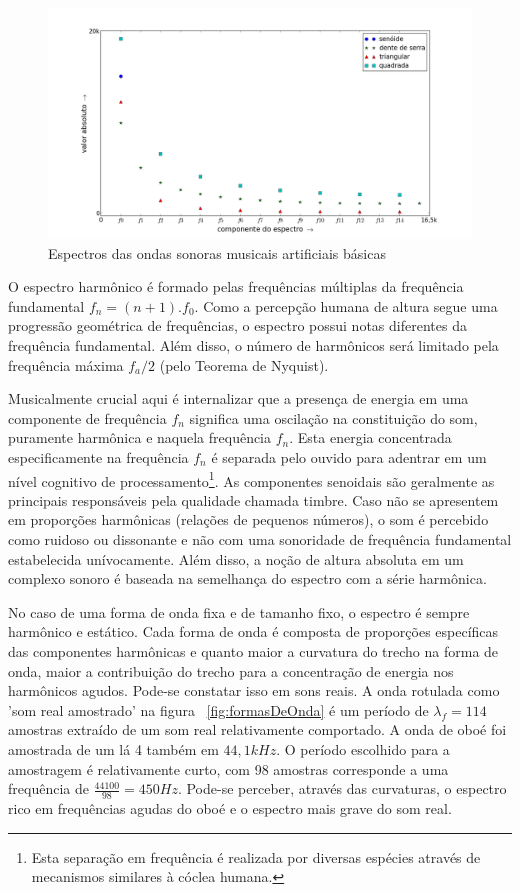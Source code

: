 \begin{figure}[h!]
    \centering
        \includegraphics[width=\textwidth]{figuras/espectroDeOndas6}
    \caption{Espectros das ondas sonoras musicais artificiais básicas}
        \label{fig:espectroDeOndas}
\end{figure}


O espectro harmônico é formado pelas frequências múltiplas da frequência fundamental $f_n=(n+1).f_0$.
Como a percepção humana de altura segue uma progressão geométrica de frequências, o espectro possui notas diferentes da frequência fundamental. Além disso, o número de harmônicos será limitado pela frequência máxima $f_a/2$ (pelo Teorema de Nyquist). 

Musicalmente crucial aqui é internalizar que a presença de
energia
em uma componente de frequência $f_n$ significa
 uma oscilação na constituição do som, puramente harmônica e naquela frequência $f_n$. Esta energia concentrada especificamente na frequência $f_n$ é separada
 pelo ouvido para adentrar em um nível cognitivo de processamento\footnote{Esta separação em frequência é realizada por diversas espécies através de mecanismos similares à cóclea humana.\cite{Roederer}}.
  As componentes senoidais são geralmente as principais responsáveis pela qualidade chamada timbre. Caso não se apresentem em proporções harmônicas (relações de pequenos números), o som é percebido como ruidoso ou dissonante e não com uma sonoridade de frequência fundamental estabelecida unívocamente. Além disso, a noção de altura absoluta em um complexo sonoro é baseada na semelhança do espectro com a série harmônica.\cite{Roederer}

No caso de uma forma de onda fixa e de tamanho fixo, o espectro é sempre harmônico e estático. Cada forma de onda é composta de proporções específicas das componentes harmônicas e 
quanto maior a curvatura do trecho na forma de onda, maior a contribuição do trecho para a
concentração de energia nos harmônicos agudos. Pode-se constatar isso em sons reais. A onda rotulada como 'som real amostrado' na figura ~\ref{fig:formasDeOnda} é um período de $\lambda_f=114$ amostras extraído de um som real relativamente comportado. A onda de oboé foi amostrada de um lá 4 também em $44,1kHz$.
O período escolhido para a amostragem é relativamente curto, com 98 amostras corresponde a 
uma frequência de $\frac{44100}{98}=450 Hz$. Pode-se perceber, através das curvaturas, o espectro rico em 
frequências agudas do oboé e o espectro mais grave do som real.

